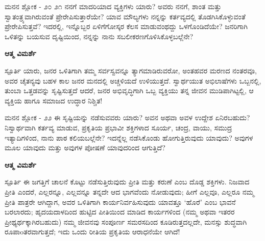 \begin{mananam}{\mananamfont ಮನನ ಶ್ಲೋಕ - ೨೦ ೨೧}
\mananamtext ನನಗೆ ಮಾದರಿಯಾದ ವ್ಯಕ್ತಿಗಳು ಯಾರು? ಅವರು ನನಗೆ, ಶಾಂತ ಮತ್ತು ಸ್ವಾತಂತ್ರ್ಯವಾಗಿರುವಂತೆ ಪ್ರೇರೇಪಿಸುತ್ತಾರೆಯೇ? ಯಾವ ಮೌಲ್ಯಗಳು ನನ್ನನ್ನು ಕರ್ತವ್ಯದಲ್ಲಿ ತೊಡಗಿಸಿಕೊಳ್ಳುವಂತೆ ಪ್ರೇರೇಪಿಸುತ್ತವೆ? ಇದರಲ್ಲಿ,  ಇನ್ನೊಬ್ಬರ ಏಳಿಗೆಗೋಸ್ಕರ ಕೆಲಸ ಮಾಡುವಂಥದ್ದು ಒಳಗೊಂಡಿದೆಯೇ? ಜನರಿಗಾಗಿ ಒಳಿತನ್ನು ಬಯಸುವ ದೃಷ್ಟಿಯಿಂದ, ನನ್ನನ್ನು ನಾನು ಸಬಲೀಕರಣಗೊಳಿಸಿಕೊಳ್ಳಬಲ್ಲೆನೇ? 
\end{mananam}
\WritingHand\enspace\textbf{ಆತ್ಮ ವಿಮರ್ಶೆ}\\
\begin{inspiration}{\mananamfont ಸ್ಪೂರ್ತಿ}
\mananamtext ಯಾರು, ಜನರ ಒಳಿತಿಗಾಗಿ ತಮ್ಮ ಸರ್ವಸ್ವವನ್ನೂ ತ್ಯಾಗಮಾಡಿರುವರೋ, ಅಂತಹವರ ಮರಣದ ನಂತರವೂ, ಅವರ ಚೈತನ್ಯವು ಬಹಳ ಕಾಲ ಜನರ ಮನದಲ್ಲಿ ಅಚ್ಚಳಿಯದೆ ಉಳಿಯುತ್ತದೆ. ಸ್ವಾರ್ಥಯುತ ಅಭಿಲಾಷೆಗಳು ಒಬ್ಬನಲ್ಲಿ, ತುಂಬಾ ಒತ್ತಡವನ್ನು ಸೃಷ್ಟಿಸುತ್ತದೆ ಆದರೆ, ಜನರ ಅಭಿವೃದ್ಧಿಗಾಗಿ ಒಬ್ಬ ವ್ಯಕ್ತಿಯು ತನ್ನ ಜೀವನ ಮುಡಿಪಾಗಿಟ್ಟಲ್ಲಿ, ಆ ವ್ಯಕ್ತಿಯ ಹಾಗೂ ಸಮಾಜದ ಉದ್ಧಾರ ನಿಶ್ಚಿತ!
\end{inspiration}
\newpage

\begin{mananam}{\mananamfont ಮನನ ಶ್ಲೋಕ - ೨೨}
\mananamtext  ಈ ಸೃಷ್ಟಿಯನ್ನು ನಡೆಸುವವರು ಯಾರು? ಅವನ ಅಥವಾ ಅವಳ ಉದ್ದೇಶ ಏನಿರಬಹುದು? ನಿಸ್ವಾರ್ಥವಾಗಿ ಕರ್ತವ್ಯ ಮಾಡುವ, ಪ್ರಕೃತಿಯ ಪ್ರಭಾವೀ ಶಕ್ತಿಗಳಾದ ಸೂರ್ಯ, ಚಂದ್ರ, ವಾಯು, ಸಮುದ್ರ ಇತ್ಯಾದಿಗಳಿಂದ, ನಾನು ಪಾಠ ಕಲಿಯಬಲ್ಲೆನೇ? ಇದನ್ನೆಲ್ಲ ನಡೆಸಿಕೊಂಡು ಹೋಗುತ್ತಿರುವುದು ಯಾವುದು? ಅವುಗಳ ಮೂಲ ಯಾವುದು ಮತ್ತು ಅವುಗಳ ಪೋಷಣೆ ಯಾವುದರಿಂದ ಆಗುತ್ತಿದೆ? 
\end{mananam}
\WritingHand\enspace\textbf{ಆತ್ಮ ವಿಮರ್ಶೆ}\\
\begin{inspiration}{\mananamfont ಸ್ಪೂರ್ತಿ}
\mananamtext  ಈ ಜಗತ್ತಿಗೆ ಚಾಲನೆ ಕೊಟ್ಟು ನಡೆಸುತ್ತಿರುವುದು ಪ್ರೀತಿ ಮತ್ತು ಕರುಣೆ ಎಂಬ ದೊಡ್ಡ ಶಕ್ತಿಗಳು. ನಿಜವಾದ ಪ್ರೀತಿ ಎಂದರೆ, ಎಲ್ಲರನ್ನೂ, ಎಲ್ಲವನ್ನೂ ತನ್ನದೇ ಆದ ಭಾಗವೆಂದು ನೋಡುವುದು; ಹೀಗೆ ಎಲ್ಲವೂ, ಎಲ್ಲರೂ ನಮ್ಮ ಪ್ರೀತಿ ಪಾತ್ರರೇ ಆಗಿದ್ದಾಗ, ಅವರ ಒಳಿತಿಗಾಗಿ ಕಾರ್ಯನಿರ್ವಹಿಸುವುದು ಯಾವತ್ತೂ ‘ಹೊರೆ’ ಎಂಬ ಭಾವನೆ ಬರಲಾರದು; ಹೃದಯದಾಳದಿಂದ ಹುಟ್ಟಿದ ಪೀತಿಯಿಂದ ಮಾಡಿದ ಕಾರ್ಯಗಳಿಂದ (ನಮ್ಮ ಅಥವಾ ಇತರರ ಪ್ರೀಥ್ಯರ್ಥಕ್ಕಾಗಿರಬಹುದು) ನಮ್ಮ ಜೀವನವು ಸಂಪೂರ್ಣ ಸಮರಸದಿಂದ ಕೂಡಿರುತ್ತದಲ್ಲದೇ, ಮನಸ್ಸು ಶುದ್ಧವಾಗಿ ರೂಪಾoತರವಾಗುತ್ತದೆ; ಇದು ಒಂದು ರೀತಿಯ ಪ್ರಕೃತಿಯ ಆರಾಧನೆಯೇ ಆಗಿದೆ!
\end{inspiration}
\newpage

